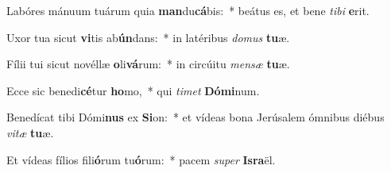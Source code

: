 \item Labóres mánuum tuárum quia \textbf{man}du\textbf{cá}bis:~* beátus es, et bene \textit{ti}\textit{bi} \textbf{e}rit.
\item Uxor tua sicut \textbf{vi}tis ab\textbf{ún}dans:~* in latéribus \textit{do}\textit{mus} \textbf{tu}æ.
\item Fílii tui sicut novéllæ \textbf{o}li\textbf{vá}rum:~* in circúitu \textit{men}\textit{sæ} \textbf{tu}æ.
\item Ecce sic benedi\textbf{cé}tur \textbf{ho}mo,~* qui \textit{ti}\textit{met} \textbf{Dó}\textbf{mi}num.
\item Benedícat tibi Dómi\textbf{nus} ex \textbf{Si}on:~* et vídeas bona Jerúsalem ómnibus diébus \textit{vi}\textit{tæ} \textbf{tu}æ.
\item Et vídeas fílios fili\textbf{ó}rum tu\textbf{ó}rum:~* pacem \textit{su}\textit{per} \textbf{Is}\textbf{ra}ël.
